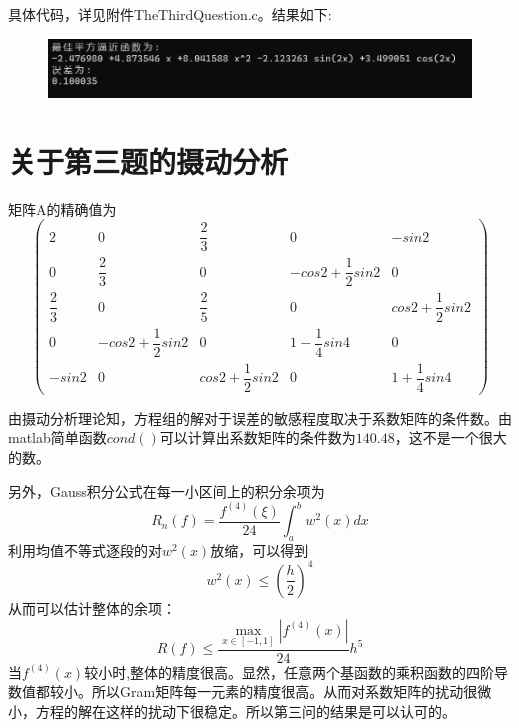 \documentclass[UTF8]{ctexart}
\begin{document}
具体代码，详见附件TheThirdQuestion.c。结果如下:
\begin{figure}[h!]
	\centering
	\includegraphics[scale=0.55]{Pic3.png}
\end{figure}

\section{关于第三题的摄动分析}
矩阵A的精确值为
\[
\left(
\begin{matrix}
	2 & 0 & \dfrac{2}{3} & 0 &-sin2 \\
	0 & \dfrac{2}{3} & 0 & -cos2+\dfrac{1}{2}sin2 & 0\\
	\dfrac{2}{3} & 0 & \dfrac{2}{5} & 0 & cos2+\dfrac{1}{2}sin2 \\
	0  & -cos2+\dfrac{1}{2}sin2 & 0 & 1-\dfrac{1}{4}sin4 & 0 \\
	-sin2 & 0 & cos2+\dfrac{1}{2}sin2 & 0 & 1+\dfrac{1}{4}sin4 
\end{matrix}
\right)
\]

由摄动分析理论知，方程组的解对于误差的敏感程度取决于系数矩阵的条件数。由matlab简单函数$cond()$可以计算出系数矩阵的条件数为$140.48$，这不是一个很大的数。

另外，Gauss积分公式在每一小区间上的积分余项为\\
$$R_{n}(f)=\dfrac{f^{(4)}(\xi)}{24}\int_{a}^{b}w^{2}(x)dx$$
利用均值不等式逐段的对$w^{2}(x)$放缩，可以得到$$w^{2}(x)\leqslant (\dfrac{h}{2})^{4}$$
从而可以估计整体的余项：
$$R(f)\leqslant \dfrac{\max \limits_{x\in[-1,1]}|f^{(4)}(x)|}{24} h^{5}$$
当$f^{(4)}(x)$较小时,整体的精度很高。显然，任意两个基函数的乘积函数的四阶导数值都较小。所以Gram矩阵每一元素的精度很高。从而对系数矩阵的扰动很微小，方程的解在这样的扰动下很稳定。所以第三问的结果是可以认可的。

\begin{thebibliography}{99}
	
	
\end{thebibliography}
\end{document}
